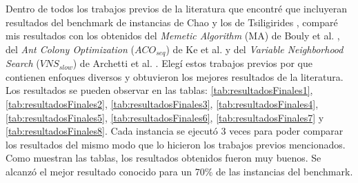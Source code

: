 Dentro de todos los trabajos previos de la literatura que encontré que incluyeran resultados del benchmark de instancias de Chao y los de Tsiligirides \cite{IntancesChaoTsiligirides}, comparé mis resultados con los obtenidos del \textit{Memetic Algorithm} (MA) de Bouly et al. \cite{BoulyDangMoukrim}, del \textit{Ant Colony Optimization} ($ACO_{seq}$) de Ke et al. \cite{KeArchettiFeng} y del \textit{Variable Neighborhood Search} ($VNS_{slow}$) de Archetti et al. \cite{ArchettiHertzSperanza}. Elegí estos trabajos previos por que contienen enfoques diversos y obtuvieron los mejores resultados de la literatura. Los resultados se pueden observar en las tablas: \ref{tab:resultadosFinales1}, \ref{tab:resultadosFinales2}, \ref{tab:resultadosFinales3}, \ref{tab:resultadosFinales4}, \ref{tab:resultadosFinales5}, \ref{tab:resultadosFinales6}, \ref{tab:resultadosFinales7} y \ref{tab:resultadosFinales8}. Cada instancia se ejecutó 3 veces para poder comparar los resultados del mismo modo que lo hicieron los trabajos previos mencionados. Como muestran las tablas, los resultados obtenidos fueron muy buenos. Se alcanzó el mejor resultado conocido para un 70\% de las instancias del benchmark.

\bigskip

